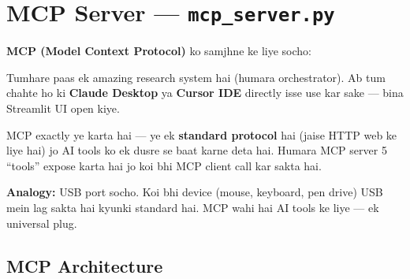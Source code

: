 \documentclass[12pt, a4paper]{article}
\begin{document}
\newpage
\section{MCP Server --- \texttt{mcp\_server.py}}

\begin{storybox}
\textbf{MCP (Model Context Protocol)} ko samjhne ke liye socho:

Tumhare paas ek amazing research system hai (humara orchestrator). Ab tum chahte ho ki \textbf{Claude Desktop} ya \textbf{Cursor IDE} directly isse use kar sake --- bina Streamlit UI open kiye.

MCP exactly ye karta hai --- ye ek \textbf{standard protocol} hai (jaise HTTP web ke liye hai) jo AI tools ko ek dusre se baat karne deta hai. Humara MCP server 5 ``tools'' expose karta hai jo koi bhi MCP client call kar sakta hai.

\textbf{Analogy:} USB port socho. Koi bhi device (mouse, keyboard, pen drive) USB mein lag sakta hai kyunki standard hai. MCP wahi hai AI tools ke liye --- ek universal plug.
\end{storybox}

\subsection{MCP Architecture}
\end{document}
